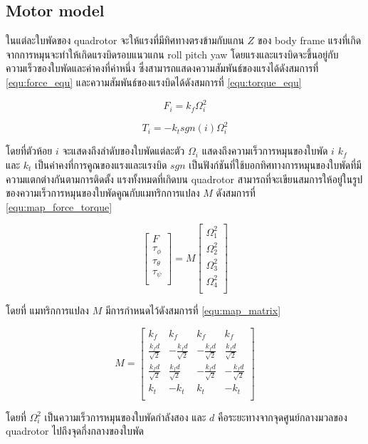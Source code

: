 \subsection{Motor model}
ในแต่ละใบพัดของ quadrotor จะให้แรงที่มีทิศทางตรงข้ามกับแกน $Z$ ของ body frame
แรงที่เกิดจากการหมุนจะทำให้เกิดแรงบิดรอบแนวแกน roll pitch yaw โดยแรงและแรงบิดจะขึ้นอยู่กับความเร็วของใบพัดและค่าคงที่ค่าหนึ่ง
ซึ่งสามารถแสดงความสัมพันธ์ของแรงได้ดังสมการที่ \ref{equ:force_equ} และความสัมพันธ์ของแรงบิดได้ดังสมการที่ \ref{equ:torque_equ}

\begin{equation}
    {F_i = k_f\Omega_i^2}
	\label{equ:force_equ}
\end{equation}

\begin{equation}
    {T_i = -k_tsgn(i)\Omega_i^2}
	\label{equ:torque_equ}
\end{equation}

โดยที่ตัวห้อย $i$ จะแสดงถึงลำดับของใบพัดแต่ละตัว $\Omega_i$ แสดงถึงความเร็วการหมุนของใบพัด $i$
$k_f$ และ $k_t$ เป็นค่าคงที่การคูณของแรงและแรงบิด $sgn$ เป็นฟังก์ชันที่ใช้บอกทิศทางการหมุนของใบพัดที่มีความแตกต่างกันตามการติดตั้ง
แรงทั้งหมดที่เกิดบน quadrotor สามารถที่จะเขียนสมการให้อยู่ในรูปของความเร็วการหมุนของใบพัดคูณกับแมทริกการแปลง $M$ ดังสมการที่ \ref{equ:map_force_torque}

\begin{equation}
    {\begin{bmatrix} 
    F \\[10pt] \tau_\phi \\[10pt] \tau_\theta \\[10pt] \tau_\psi \\
    \end{bmatrix} = M\begin{bmatrix}
    \Omega_1^2 \\[10pt]
    \Omega_2^2 \\[10pt]
    \Omega_3^2 \\[10pt]
    \Omega_4^2 \\       
    \end{bmatrix}}
	\label{equ:map_force_torque}
\end{equation}

โดยที่ แมทริกการแปลง $M$ มีการกำหนดไว้ดังสมการที่ \ref{equ:map_matrix}

\begin{equation}
    {M = \begin{bmatrix}
    k_f & k_f & k_f & k_f \\[10pt]
    \frac{k_fd}{\sqrt{2}} & -\frac{k_fd}{\sqrt{2}} & -\frac{k_fd}{\sqrt{2}} & \frac{k_fd}{\sqrt{2}}  \\[10pt]
    \frac{k_fd}{\sqrt{2}} & \frac{k_fd}{\sqrt{2}} & -\frac{k_fd}{\sqrt{2}} & -\frac{k_fd}{\sqrt{2}}  \\[10pt]
    k_t & -k_t & k_t & -k_t \\
    \end{bmatrix}}
	\label{equ:map_matrix}
\end{equation}

โดยที่ $\Omega_i^2$ เป็นความเร็วการหมุนของใบพัดกำลังสอง และ $d$ คือระยะทางจากจุดศูนย์กลางมวลของ quadrotor ไปถึงจุดกึ่งกลางของใบพัด


